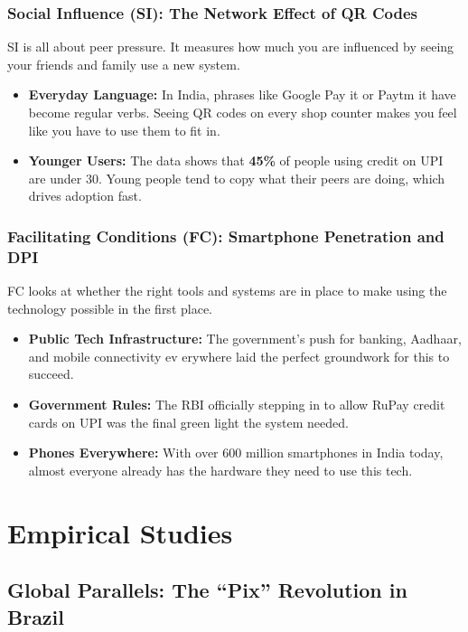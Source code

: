 \subsubsection{Social Influence (SI): The Network Effect of QR Codes}

SI is all about peer pressure. It measures how much you are influenced by seeing your friends and family use a new system.

\begin{itemize}
    \item \textbf{Everyday Language:} In India, phrases like Google Pay it or Paytm it have become regular verbs. Seeing QR codes on every shop counter makes you feel like you have to use them to fit in.
    \item \textbf{Younger Users:} The data shows that \textbf{45\%} of people using credit on UPI are under 30. Young people tend to copy what their peers are doing, which drives adoption fast.
\end{itemize}

\subsubsection{Facilitating Conditions (FC): Smartphone Penetration and DPI}

FC looks at whether the right tools and systems are in place to make using the technology possible in the first place.

\begin{itemize}
    \item \textbf{Public Tech Infrastructure:} The government's push for banking, Aadhaar, and mobile connectivity ev erywhere laid the perfect groundwork for this to succeed.
    \item \textbf{Government Rules:} The RBI officially stepping in to allow RuPay credit cards on UPI was the final green light the system needed.
    \item \textbf{Phones Everywhere:} With over 600 million smartphones in India today, almost everyone already has the hardware they need to use this tech.
\end{itemize}

\section{Empirical Studies}

\subsection{Global Parallels: The ``Pix'' Revolution in Brazil}

